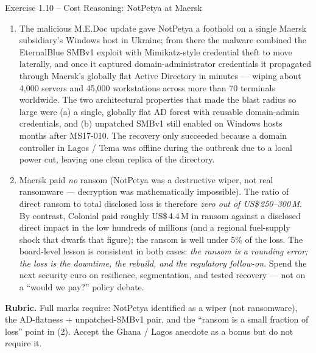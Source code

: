 \documentclass[11pt,a4paper]{article}
\begin{document}
\begin{solutionbox}{Exercise 1.10 -- Cost Reasoning: NotPetya at Maersk}
\begin{enumerate}
  \item The malicious M.E.Doc update gave NotPetya a foothold on a single Maersk subsidiary's Windows host in Ukraine; from there the malware combined the EternalBlue SMBv1 exploit with Mimikatz-style credential theft to move laterally, and once it captured domain-administrator credentials it propagated through Maersk's globally flat Active Directory in minutes --- wiping about 4{,}000 servers and 45{,}000 workstations across more than 70 terminals worldwide. The two architectural properties that made the blast radius so large were (a) a single, globally flat AD forest with reusable domain-admin credentials, and (b) unpatched SMBv1 still enabled on Windows hosts months after MS17-010. The recovery only succeeded because a domain controller in Lagos / Tema was offline during the outbreak due to a local power cut, leaving one clean replica of the directory.
  \item Maersk paid \emph{no} ransom (NotPetya was a destructive wiper, not real ransomware --- decryption was mathematically impossible). The ratio of direct ransom to total disclosed loss is therefore \emph{zero out of US\$\,250--300\,M}. By contrast, Colonial paid roughly US\$\,4.4\,M in ransom against a disclosed direct impact in the low hundreds of millions (and a regional fuel-supply shock that dwarfs that figure); the ransom is well under 5\% of the loss. The board-level lesson is consistent in both cases: \emph{the ransom is a rounding error; the loss is the downtime, the rebuild, and the regulatory follow-on}. Spend the next security euro on resilience, segmentation, and tested recovery --- not on a ``would we pay?'' policy debate.
\end{enumerate}

\textbf{Rubric.} Full marks require: NotPetya identified as a wiper (not ransomware), the AD-flatness + unpatched-SMBv1 pair, and the ``ransom is a small fraction of loss'' point in (2). Accept the Ghana / Lagos anecdote as a bonus but do not require it.
\end{solutionbox}
\end{document}
